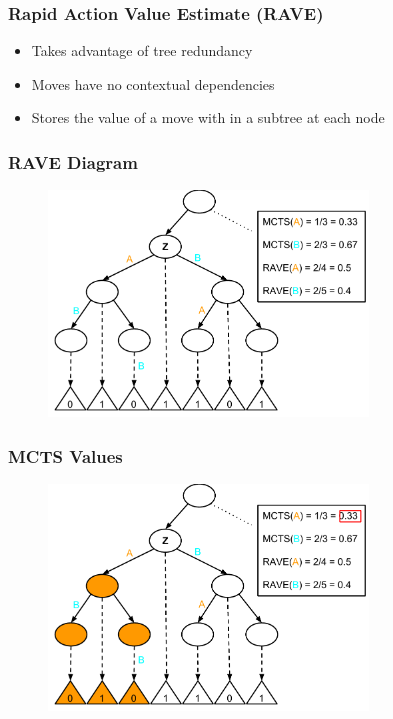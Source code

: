 \documentclass{beamer}
\begin{document}
\begin{frame}
\frametitle{Rapid Action Value Estimate (RAVE)}
\begin{itemize}
	\item Takes advantage of tree redundancy
	\item Moves have no contextual dependencies
	\item Stores the value of a move with in a subtree at each node
\end{itemize}
\end{frame}


\begin{frame}[fragile]
\frametitle{RAVE Diagram}
\begin{figure}[h]
	\includegraphics[width=8.5cm]{Diagrams/Rave/RAVEDiagram.pdf}
	\centering
\end{figure}
\end{frame}

\begin{frame}[fragile]
\frametitle{MCTS Values}
\begin{figure}[h]
	\includegraphics[width=8.5cm]{Diagrams/Rave/MCTSValueA.pdf}
	\centering
\end{figure}
\end{frame}
\end{document}
